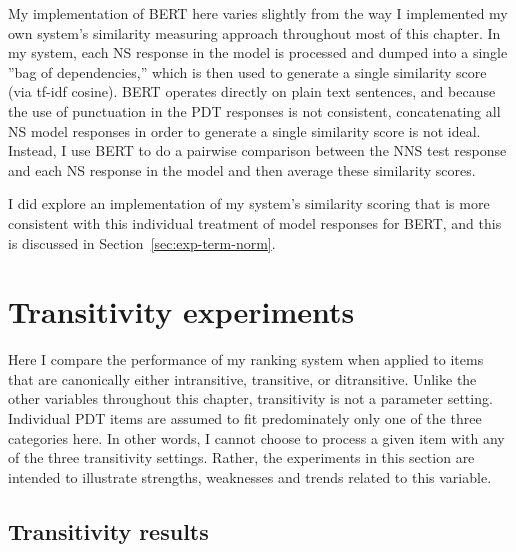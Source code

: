 My implementation of BERT here varies slightly from the way I implemented my own system's similarity measuring approach throughout most of this chapter. In my system, each NS response in the model is processed and dumped into a single ''bag of dependencies,'' which is then used to generate a single similarity score (via tf-idf cosine). BERT operates directly on plain text sentences, and because the use of punctuation in the PDT responses is not consistent, concatenating all NS model responses in order to generate a single similarity score is not ideal. Instead, I use BERT to do a pairwise comparison between the NNS test response and each NS response in the model and then average these similarity scores.

I did explore an implementation of my system's similarity scoring that is more consistent with this individual treatment of model responses for BERT, and this is discussed in Section~\ref{sec:exp-term-norm}.


\section{Transitivity experiments}
\label{sec:exp-transitivity}
Here I compare the performance of my ranking system when applied to items that are canonically either intransitive, transitive, or ditransitive. Unlike the other variables throughout this chapter, transitivity is not a parameter setting. Individual PDT items are assumed to fit predominately only one of the three categories here. In other words, I cannot choose to process a given item with any of the three transitivity settings. Rather, the experiments in this section are intended to illustrate strengths, weaknesses and trends related to this variable.

\subsection{Transitivity results}
\label{sec:transitivity-results}

